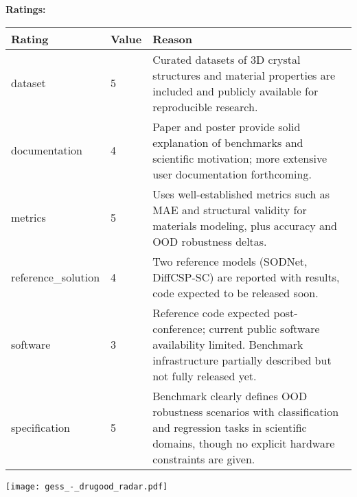 {{{\bf Ratings:} ~ \\

\begin{tabular}{p{} p{} p{}}
\hline
Rating & Value & Reason \\
\hline
dataset & 5 & Curated datasets of 3D crystal structures and material properties are included and
publicly available for reproducible research.
 \\
documentation & 4 & Paper and poster provide solid explanation of benchmarks and scientific motivation;
more extensive user documentation forthcoming.
 \\
metrics & 5 & Uses well-established metrics such as MAE and structural validity for materials modeling,
plus accuracy and OOD robustness deltas.
 \\
reference\_solution & 4 & Two reference models (SODNet, DiffCSP-SC) are reported with results, code expected
to be released soon.
 \\
software & 3 & Reference code expected post-conference; current public software availability limited.
Benchmark infrastructure partially described but not fully released yet.
 \\
specification & 5 & Benchmark clearly defines OOD robustness scenarios with classification and regression
tasks in scientific domains, though no explicit hardware constraints are given.
 \\
\hline
\end{tabular}

\texttt{[image: gess\_-\_drugood\_radar.pdf]}
}}
\clearpage